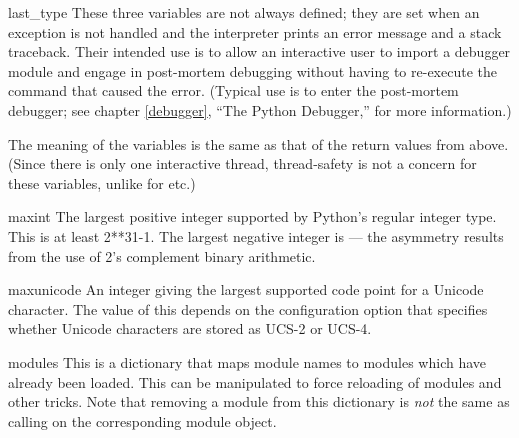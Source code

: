 \begin{datadesc}{last_type}
  These three variables are not always defined; they are set when an
  exception is not handled and the interpreter prints an error message
  and a stack traceback.  Their intended use is to allow an
  interactive user to import a debugger module and engage in
  post-mortem debugging without having to re-execute the command that
  caused the error.  (Typical use is  to
  enter the post-mortem debugger; see chapter \ref{debugger}, ``The
  Python Debugger,'' for more information.)

  The meaning of the variables is the same as that of the return
  values from  above.  (Since there is only one
  interactive thread, thread-safety is not a concern for these
  variables, unlike for  etc.)
\end{datadesc}

\begin{datadesc}{maxint}
  The largest positive integer supported by Python's regular integer
  type.  This is at least 2**31-1.  The largest negative integer is
   --- the asymmetry results from the use of 2's
  complement binary arithmetic.
\end{datadesc}

\begin{datadesc}{maxunicode}
  An integer giving the largest supported code point for a Unicode
  character.  The value of this depends on the configuration option
  that specifies whether Unicode characters are stored as UCS-2 or
  UCS-4.
\end{datadesc}

\begin{datadesc}{modules}
  This is a dictionary that maps module names to modules which have
  already been loaded.  This can be manipulated to force reloading of
  modules and other tricks.  Note that removing a module from this
  dictionary is \emph{not} the same as calling
   on the corresponding module
  object.
\end{datadesc}

